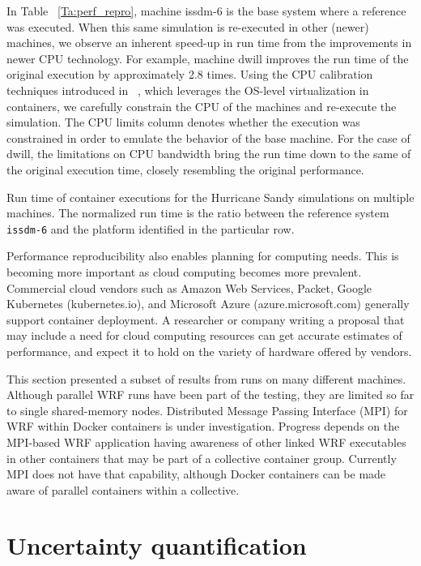 \documentclass[final]{ametsoc}
\begin{document}
In Table ~\ref{Ta:perf_repro}, machine issdm-6 is the base system where a reference was executed. When this same simulation is re-executed in other (newer) machines, we observe an inherent speed-up in run time from the improvements in newer CPU technology. For example, machine dwill improves the run time of the original execution by approximately 2.8 times. Using the CPU calibration techniques introduced in ~\cite{Jimenez1605:Characterizing}, which leverages the OS-level virtualization in containers, we carefully constrain the CPU of the machines and re-execute the simulation. The CPU limits column denotes whether the execution was constrained in order to emulate the behavior of the base machine. For the case of dwill, the limitations on CPU bandwidth bring the run time down to the same of the original execution time, closely resembling the original performance.

\begin{table}\caption{\label{Ta:perf_repro} Run time of container executions for the Hurricane Sandy simulations on multiple machines. The normalized run time is the ratio between the reference system \texttt{issdm-6} and the platform identified in the particular row.}

\end{table}

Performance reproducibility also enables planning for computing needs. This is becoming more important as cloud computing becomes more prevalent. Commercial cloud vendors such as Amazon Web Services, Packet, Google Kubernetes (kubernetes.io), and Microsoft Azure (azure.microsoft.com) generally support container deployment. A researcher or company writing a proposal that may include a need for cloud computing resources can get accurate estimates of performance, and expect it to hold on the variety of hardware offered by vendors.

This section presented a subset of results from runs on many different machines.  Although parallel WRF runs have been part of the testing, they are limited so far to single shared-memory nodes. Distributed Message Passing Interface (MPI) for WRF within Docker containers is under investigation. Progress depends on the MPI-based WRF application having awareness of other linked WRF executables in other containers that may be part of a collective container group. Currently MPI does not have that capability, although Docker containers can be made aware of parallel containers within a collective. 

\section{Uncertainty quantification}\label{sec:uncertainty}
\end{document}
